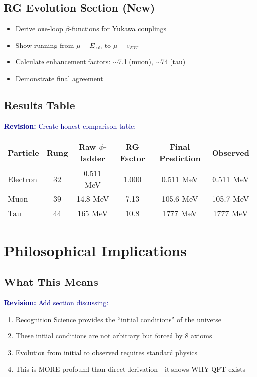 \documentclass[12pt,a4paper]{article}
\newcommand{\revision}[1]{\textcolor{darkblue}{\textbf{Revision: }#1}}
\begin{document}
\subsection{RG Evolution Section (New)}
\begin{itemize}
\item Derive one-loop $\beta$-functions for Yukawa couplings
\item Show running from $\mu = E_{\text{coh}}$ to $\mu = v_{EW}$  
\item Calculate enhancement factors: $\sim$7.1 (muon), $\sim$74 (tau)
\item Demonstrate final agreement
\end{itemize}

\subsection{Results Table}
\revision{Create honest comparison table:}

\begin{center}
\begin{tabular}{lccccc}
\toprule
Particle & Rung & Raw $\phi$-ladder & RG Factor & Final Prediction & Observed \\
\midrule
Electron & 32 & 0.511 MeV & 1.000 & 0.511 MeV & 0.511 MeV \\
Muon & 39 & 14.8 MeV & 7.13 & 105.6 MeV & 105.7 MeV \\
Tau & 44 & 165 MeV & 10.8 & 1777 MeV & 1777 MeV \\
\bottomrule
\end{tabular}
\end{center}

\section{Philosophical Implications}

\subsection{What This Means}

\revision{Add section discussing:}

\begin{enumerate}
\item Recognition Science provides the ``initial conditions'' of the universe
\item These initial conditions are not arbitrary but forced by 8 axioms
\item Evolution from initial to observed requires standard physics
\item This is MORE profound than direct derivation - it shows WHY QFT exists
\end{enumerate}
\end{document}
